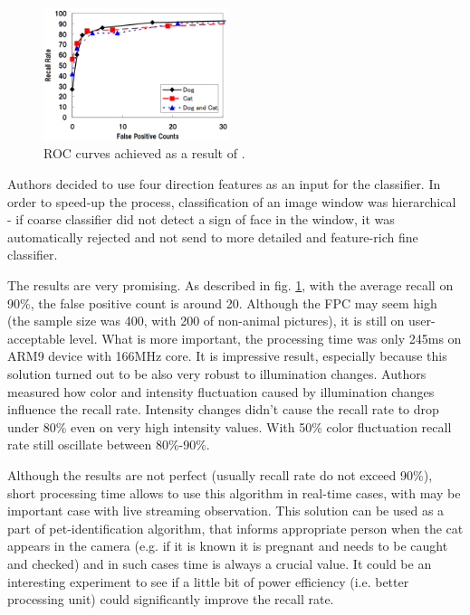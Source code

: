 \documentclass[hyperref]{acmtrans2e}
\begin{document}
\begin{figure}
\centering
    \includegraphics[width=0.48\textwidth]{roc_edges}
  \caption{ROC curves achieved as a result of \protect\cite{edges:2011}.}
  \label{fig:roc_edges}
\end{figure}

Authors decided to use four direction features as an input for the classifier. In order to speed-up the process, classification of an image window was hierarchical - if coarse classifier did not detect a sign of face in the window, it was automatically rejected and not send to more detailed and feature-rich fine classifier. 

The results are very promising. As described in fig. \ref{fig:roc_edges}, with the average recall on 90\%, the false positive count is around 20. Although the FPC may seem high (the sample size was 400, with 200 of non-animal pictures), it is still on user-acceptable level. What is more important, the processing time was only 245ms on ARM9 device with 166MHz core. It is impressive result, especially because this solution turned out to be also very robust to illumination changes. Authors measured how color and intensity fluctuation caused by illumination changes influence the recall rate. Intensity changes didn't cause the recall rate to drop under 80\% even on very high intensity values. With 50\% color fluctuation recall rate still oscillate between 80\%-90\%. 

Although the results are not perfect (usually recall rate do not exceed 90\%), short processing time allows to use this algorithm in real-time cases, with may be important case with live streaming observation. This solution can be used as a part of pet-identification algorithm, that informs appropriate person when the cat appears in the camera (e.g. if it is known it is pregnant and needs to be caught and checked) and in such cases time is always a crucial value. It could be an interesting experiment to see if a little bit of power efficiency (i.e. better processing unit) could significantly improve the recall rate.
\end{document}
